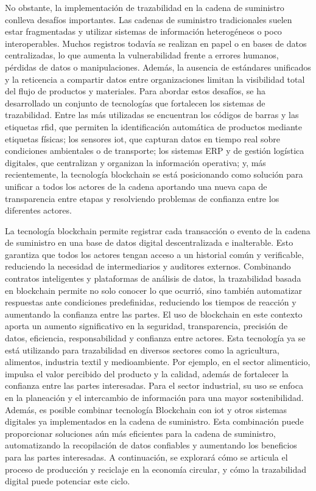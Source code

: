 No obstante, la implementación de trazabilidad en la cadena de suministro conlleva desafíos importantes. Las cadenas de suministro tradicionales suelen estar fragmentadas y utilizar sistemas de información heterogéneos o poco interoperables. Muchos registros todavía se realizan en papel o en bases de datos centralizadas, lo que aumenta la vulnerabilidad frente a errores humanos, pérdidas de datos o manipulaciones. Además, la ausencia de estándares unificados y la reticencia a compartir datos entre organizaciones limitan la visibilidad total del flujo de productos y materiales. Para abordar estos desafíos, se ha desarrollado un conjunto de tecnologías que fortalecen los sistemas de trazabilidad. Entre las más utilizadas se encuentran los códigos de barras y las etiquetas \acrshort{rfid}, que permiten la identificación automática de productos mediante etiquetas físicas; los sensores \acrshort{iot}, que capturan datos en tiempo real sobre condiciones ambientales o de transporte; los sistemas ERP y de gestión logística digitales, que centralizan y organizan la información operativa; y, más recientemente, la tecnología blockchain se está posicionando como solución para unificar a todos los actores de la cadena aportando una nueva capa de transparencia entre etapas y resolviendo problemas de confianza entre los diferentes actores.

La tecnología blockchain permite registrar cada transacción o evento de la cadena de suministro en una base de datos digital descentralizada e inalterable. Esto garantiza que todos los actores tengan acceso a un historial común y verificable, reduciendo la necesidad de intermediarios y auditores externos. Combinando contratos inteligentes y plataformas de análisis de datos, la trazabilidad basada en blockchain permite no solo conocer lo que ocurrió, sino también automatizar respuestas ante condiciones predefinidas, reduciendo los tiempos de reacción y aumentando la confianza entre las partes. El uso de blockchain en este contexto aporta un aumento significativo en la seguridad, transparencia, precisión de datos, eficiencia, responsabilidad y confianza entre actores. Esta tecnología ya se está utilizando para trazabilidad en diversos sectores como la agricultura, alimentos, industria textil y medioambiente. Por ejemplo, en el sector alimenticio, impulsa el valor percibido del producto y la calidad, además de fortalecer la confianza entre las partes interesadas. Para el sector industrial, su uso se enfoca en la planeación y el intercambio de información para una mayor sostenibilidad. Además, es posible combinar tecnología Blockchain con \acrshort{iot} y otros sistemas digitales ya implementados en la cadena de suministro. Esta combinación puede proporcionar soluciones aún más eficientes para la cadena de suministro, automatizando la recopilación de datos confiables y aumentando los beneficios para las partes interesadas. A continuación, se explorará cómo se articula el proceso de producción y reciclaje en la economía circular, y cómo la trazabilidad digital puede potenciar este ciclo.


